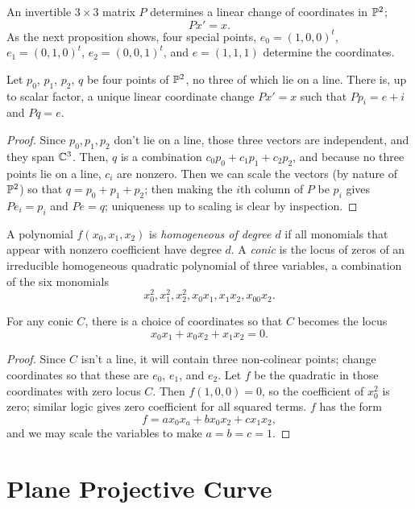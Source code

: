 \documentclass{report}
\begin{document}
An invertible $3 \times 3$ matrix $P$ determines a linear change of coordinates in $\mathbb{P}^2$;
\[ Px' = x. \]
As the next proposition shows, four special points, $e_0 = (1,0,0)^t$, $e_1 = (0,1,0)^t$, $e_2 = (0,0,1)^t$, and $e = (1,1,1)$ determine the coordinates.

\begin{proposition}
  Let $p_0$, $p_1$, $p_2$, $q$ be four points of $\mathbb{P}^2$, no three of which lie on a line.
  There is, up to scalar factor, a unique linear coordinate change $Px' = x$ such that $Pp_i = e+i$ and $Pq = e$.
\end{proposition}
\begin{proof}
  Since $p_0,p_1,p_2$ don't lie on a line, those three vectors are independent, and they span $\mathbb{C}^3$.
  Then, $q$ is a combination $c_0p_0 + c_1p_1 + c_2p_2$, and because no three points lie on a line, $c_i$ are nonzero.
  Then we can scale the vectors (by nature of $\mathbb{P}^2$) so that $q = p_0 + p_1 + p_2$; then making the $i$th column of $P$ be $p_i$ gives $Pe_i = p_i$ and $Pe = q$; uniqueness up to scaling is clear by inspection.
\end{proof}

A polynomial $f(x_0,x_1,x_2)$ is \emph{homogeneous of degree $d$} if all monomials that appear with nonzero coefficient have degree $d$.
A \emph{conic} is the locus of zeros of an irreducible homogeneous quadratic polynomial of three variables, a combination of the six monomials
\[
  x_0^2,x_1^2,x_2^2,x_0x_1,x_1x_2,x_00x_2.
\]
\begin{proposition}
  For any conic $C$, there is a choice of coordinates so that $C$ becomes the locus
  \[ x_0x_1 + x_0x_2 + x_1x_2 = 0. \]
\end{proposition}
\begin{proof}
  Since $C$ isn't a line, it will contain three non-colinear points;
  change coordinates so that these are $e_0$, $e_1$, and $e_2$.
  Let $f$ be the quadratic in those coordinates with zero locus $C$.
  Then $f(1,0,0) = 0$, so the coefficient of $x_0^2$ is zero; similar logic gives zero coefficient for all squared terms.
  $f$ has the form
  \[ f = ax_0x_a + bx_0x_2 + cx_1x_2, \]
  and we may scale the variables to make $a=b=c=1$.
\end{proof}
 
\newpage
\section{Plane Projective Curve}
\end{document}
